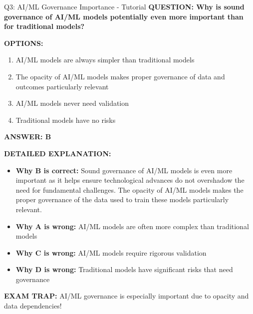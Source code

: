 \documentclass[8pt]{beamer}
\begin{document}
	\begin{frame}{Q3: AI/ML Governance Importance - Tutorial}
		\fontsize{6.5}{7.5}\selectfont
		\textbf{QUESTION: Why is sound governance of AI/ML models potentially even more important than for traditional models?}
		
		\vspace{0.1cm}
		\textbf{OPTIONS:}
		\begin{enumerate}
			\item AI/ML models are always simpler than traditional models
			\item The opacity of AI/ML models makes proper governance of data and outcomes particularly relevant
			\item AI/ML models never need validation
			\item Traditional models have no risks
		\end{enumerate}
		
		\vspace{0.1cm}
		\textcolor{myblue}{\textbf{ANSWER: B}}
		
		\vspace{0.1cm}
		\textbf{DETAILED EXPLANATION:}
		\begin{itemize}
			\item \textbf{Why B is correct:} Sound governance of AI/ML models is even more important as it helps ensure technological advances do not overshadow the need for fundamental challenges. The opacity of AI/ML models makes the proper governance of the data used to train these models particularly relevant.
			\item \textbf{Why A is wrong:} AI/ML models are often more complex than traditional models
			\item \textbf{Why C is wrong:} AI/ML models require rigorous validation
			\item \textbf{Why D is wrong:} Traditional models have significant risks that need governance
		\end{itemize}
		
		\textcolor{myred}{\textbf{EXAM TRAP:}} AI/ML governance is \textcolor{myblue}{especially important due to opacity and data dependencies}!
	\end{frame}
	
\end{document}
